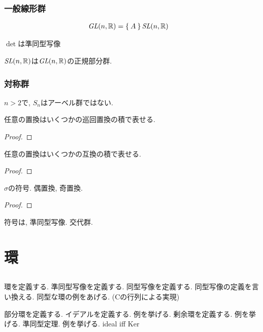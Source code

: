   \subsection{一般線形群}
  \begin{align*}
    \textit{GL}(n,\mathbb{R})&=\Set{A}
    \textit{SL}(n,\mathbb{R})&
  \end{align*}
  \begin{example}
    $\det$は準同型写像
  \end{example}
  \begin{example}
    $\textit{SL}(n,\mathbb{R})$は$\textit{GL}(n,\mathbb{R})$の正規部分群.
  \end{example}

  \subsection{対称群}
  $n>2$で,
  $S_n$はアーベル群ではない.

  \begin{theorem}
    任意の置換はいくつかの巡回置換の積で表せる.
  \end{theorem}
\begin{proof}\end{proof}

\begin{theorem}
    任意の置換はいくつかの互換の積で表せる.
  \end{theorem}
\begin{proof}\end{proof}

  \begin{definition}
    $\sigma$の符号.  偶置換, 奇置換.
  \end{definition}
\begin{proof}\end{proof}

  符号は, 準同型写像.  交代群.

  \chapter{環}
  \section{}
 環を定義する.
 準同型写像を定義する.
 同型写像を定義する.
 同型写像の定義を言い換える.
 同型な環の例をあげる.
 (Cの行列による実現)
 
 部分環を定義する.
 イデアルを定義する.
 例を挙げる.
 剰余環を定義する.
 例を挙げる.
 準同型定理.
 例を挙げる.
 ideal iff Ker
 
